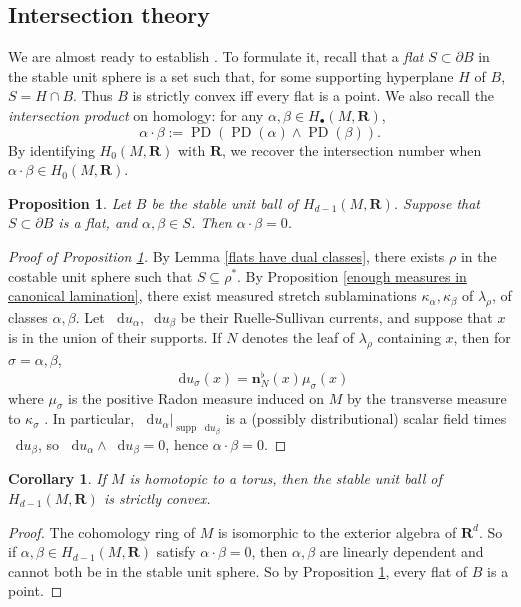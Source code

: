 \documentclass[reqno,11pt]{amsart}
\newcommand{\RR}{\mathbf{R}}
\newcommand*\dif{\mathop{}\!\mathrm{d}}
\DeclareMathOperator{\PD}{PD}
\DeclareMathOperator{\supp}{supp}
\newcommand{\normal}{\mathbf n}
\newcommand{\dfn}[1]{\emph{#1}\index{#1}}
\newtheorem{proposition}[theorem]{Proposition}
\newtheorem{corollary}[theorem]{Corollary}
\theoremstyle{definition}
\numberwithin{equation}{section}
\begin{document}
\subsection{Intersection theory}
We are almost ready to establish \cite[Theorem 6]{Auer01}.
To formulate it, recall that a \dfn{flat} $S \subset \partial B$ in the stable unit sphere is a set such that, for some supporting hyperplane $H$ of $B$, $S = H \cap B$.
Thus $B$ is strictly convex iff every flat is a point.
We also recall the \dfn{intersection product} on homology: for any $\alpha, \beta \in H_\bullet(M, \RR)$,
$$\alpha \cdot \beta := \PD(\PD(\alpha) \wedge \PD(\beta)).$$
By identifying $H_0(M, \RR)$ with $\RR$, we recover the intersection number when $\alpha \cdot \beta \in H_0(M, \RR)$.

\begin{proposition}\label{flats are nonintersecting}
Let $B$ be the stable unit ball of $H_{d - 1}(M, \RR)$.
Suppose that $S \subset \partial B$ is a flat, and $\alpha, \beta \in S$.
Then $\alpha \cdot \beta = 0$.
\end{proposition}


\begin{proof}[Proof of Proposition \ref{flats are nonintersecting}]
By Lemma \ref{flats have dual classes}, there exists $\rho$ in the costable unit sphere such that $S \subseteq \rho^*$.
By Proposition \ref{enough measures in canonical lamination}, there exist measured stretch sublaminations $\kappa_\alpha, \kappa_\beta$ of $\lambda_\rho$, of classes $\alpha, \beta$.
Let $\dif u_\alpha, \dif u_\beta$ be their Ruelle-Sullivan currents, and suppose that $x$ is in the union of their supports.
If $N$ denotes the leaf of $\lambda_\rho$ containing $x$, then for $\sigma = \alpha, \beta$,
$$\dif u_\sigma(x) = \normal_N^\flat(x) \mu_\sigma(x)$$
where $\mu_\sigma$ is the positive Radon measure induced on $M$ by the transverse measure to $\kappa_\sigma$ \cite[Lemma 3.1]{BackusCML}.
In particular, $\dif u_\alpha|_{\supp \dif u_\beta}$ is a (possibly distributional) scalar field times $\dif u_\beta$, so $\dif u_\alpha \wedge \dif u_\beta = 0$, hence $\alpha \cdot \beta = 0$.
\end{proof}

\begin{corollary}
If $M$ is homotopic to a torus, then the stable unit ball of $H_{d - 1}(M, \RR)$ is strictly convex.
\end{corollary}
\begin{proof}
The cohomology ring of $M$ is isomorphic to the exterior algebra of $\RR^d$.
So if $\alpha, \beta \in H_{d - 1}(M, \RR)$ satisfy $\alpha \cdot \beta = 0$, then $\alpha, \beta$ are linearly dependent and cannot both be in the stable unit sphere.
So by Proposition \ref{flats are nonintersecting}, every flat of $B$ is a point.
\end{proof}
\end{document}
